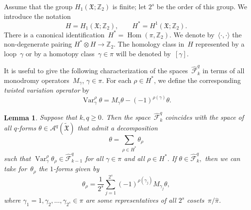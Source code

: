 \documentclass[reqno,tbtags,12pt]{amsart}
\numberwithin{equation}{section}
\newcommand{\Z}{\mathbb{Z}}
\newcommand{\FX}{\mathfrak{X}}
\newcommand{\tFX}{\widetilde{\mathfrak{X}}}
\newcommand{\hpi}{\hat{\pi}}
\newcommand{\hCF}{\widehat{\mathcal{F}}}
\newcommand{\A}{\mathcal{A}}
\newcommand{\Hom}{\mathop{\mathrm{Hom}}\nolimits}
\newcommand{\Var}{\mathop{\mathrm{Var}}\nolimits}
\newtheorem{lem}[theorem]{Lemma}
\theoremstyle{definition}
\begin{document}
Assume that the group  $H_1(\FX;\Z_2)$ is finite; let $2^s$ be the order of this group. We introduce the notation
$$
H=H_1(\FX;\Z_2),\qquad
H^*=H^1(\FX;\Z_2).
$$
There is a canonical identification~$H^*=\Hom(\pi,\Z_2)$. We denote by~$\langle\cdot,\cdot\rangle$ the non-degenerate pairing $H^*\otimes H\to\Z_2$.  The homology class in~$H$ represented by a loop~$\gamma$ or by a homotopy class~$\gamma\in\pi$ will be denoted by~$[\gamma]$.



It is useful to give the following characterization of the spaces~$\hCF_k^q$  in terms of  all monodromy operators~$M_{\gamma}$, $\gamma\in\pi$. For each $\rho\in H^*$, we define the corresponding \textit{twisted variation operator\/} by
\begin{equation*}
\Var_{\gamma}^{\rho}\theta=M_{\gamma}\theta-(-1)^{\rho(\gamma)}\theta.
\end{equation*}

\begin{lem}\label{lem_decompose}
Suppose that\/ $k,q\ge 0$. Then the space\/~$\hCF_k^q$ coincides with the space of all\/ $q$-forms\/ $\theta\in\A^q(\tFX)$ that admit a decomposition
\begin{equation}\label{eq_decompose}
\theta=\sum_{\rho\in H^*}\theta_{\rho}
\end{equation} 
such that\/ $\Var_{\gamma}^{\rho}\theta_{\rho}\in\hCF_{k-1}^q$ for all\/ $\gamma\in\pi$ and all\/ $\rho\in H^*$. If\/ $\theta\in\hCF_k^q,$ then we can take for\/~$\theta_{\rho}$ the\/ $1$-forms given by
\begin{equation}\label{eq_Phi_rho}
\theta_{\rho}=\frac{1}{2^s}\sum_{j=1}^{2^s}(-1)^{\rho(\gamma_j)}M_{\gamma_j}\theta,
\end{equation}
where\/ $\gamma_1=1,\gamma_2,\ldots,\gamma_{2^s}\in\pi$ are some representatives of all\/  $2^s$ cosets\/~$\pi/\hpi$.
\end{lem}
\end{document}
